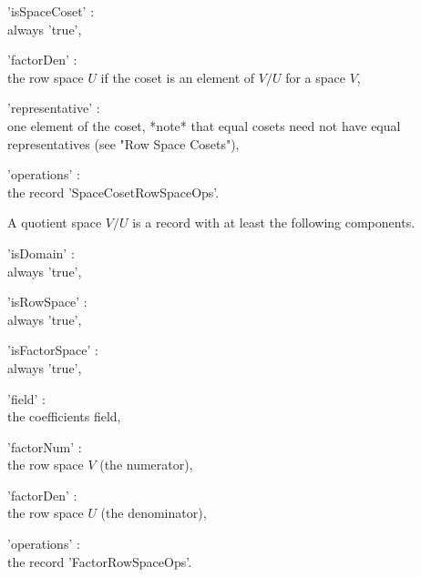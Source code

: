 'isSpaceCoset' : \\
    always 'true',

'factorDen' : \\
    the row space $U$ if the coset is an element of $V / U$ for a space $V$,

'representative' : \\
    one element of the coset, *note* that equal cosets need not have equal
    representatives (see "Row Space Cosets"),
          
'operations' : \\
    the record 'SpaceCosetRowSpaceOps'.


A quotient space $V / U$ is a record with at least the following components.

'isDomain' : \\
    always 'true',

'isRowSpace' : \\
    always 'true',

'isFactorSpace' : \\
    always 'true',

'field' : \\
    the coefficients field,

'factorNum' : \\
    the row space $V$ (the numerator),

'factorDen' : \\
    the row space $U$ (the denominator),

'operations' : \\
    the record 'FactorRowSpaceOps'.

